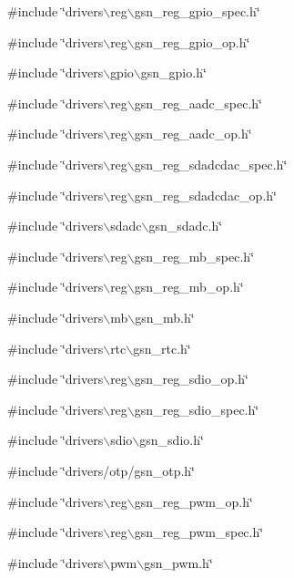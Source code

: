 {\ttfamily \#include \char`\"{}drivers$\backslash$reg$\backslash$gsn\_\-reg\_\-gpio\_\-spec.h\char`\"{}}\par
{\ttfamily \#include \char`\"{}drivers$\backslash$reg$\backslash$gsn\_\-reg\_\-gpio\_\-op.h\char`\"{}}\par
{\ttfamily \#include \char`\"{}drivers$\backslash$gpio$\backslash$gsn\_\-gpio.h\char`\"{}}\par
{\ttfamily \#include \char`\"{}drivers$\backslash$reg$\backslash$gsn\_\-reg\_\-aadc\_\-spec.h\char`\"{}}\par
{\ttfamily \#include \char`\"{}drivers$\backslash$reg$\backslash$gsn\_\-reg\_\-aadc\_\-op.h\char`\"{}}\par
{\ttfamily \#include \char`\"{}drivers$\backslash$reg$\backslash$gsn\_\-reg\_\-sdadcdac\_\-spec.h\char`\"{}}\par
{\ttfamily \#include \char`\"{}drivers$\backslash$reg$\backslash$gsn\_\-reg\_\-sdadcdac\_\-op.h\char`\"{}}\par
{\ttfamily \#include \char`\"{}drivers$\backslash$sdadc$\backslash$gsn\_\-sdadc.h\char`\"{}}\par
{\ttfamily \#include \char`\"{}drivers$\backslash$reg$\backslash$gsn\_\-reg\_\-mb\_\-spec.h\char`\"{}}\par
{\ttfamily \#include \char`\"{}drivers$\backslash$reg$\backslash$gsn\_\-reg\_\-mb\_\-op.h\char`\"{}}\par
{\ttfamily \#include \char`\"{}drivers$\backslash$mb$\backslash$gsn\_\-mb.h\char`\"{}}\par
{\ttfamily \#include \char`\"{}drivers$\backslash$rtc$\backslash$gsn\_\-rtc.h\char`\"{}}\par
{\ttfamily \#include \char`\"{}drivers$\backslash$reg$\backslash$gsn\_\-reg\_\-sdio\_\-op.h\char`\"{}}\par
{\ttfamily \#include \char`\"{}drivers$\backslash$reg$\backslash$gsn\_\-reg\_\-sdio\_\-spec.h\char`\"{}}\par
{\ttfamily \#include \char`\"{}drivers$\backslash$sdio$\backslash$gsn\_\-sdio.h\char`\"{}}\par
{\ttfamily \#include \char`\"{}drivers/otp/gsn\_\-otp.h\char`\"{}}\par
{\ttfamily \#include \char`\"{}drivers$\backslash$reg$\backslash$gsn\_\-reg\_\-pwm\_\-op.h\char`\"{}}\par
{\ttfamily \#include \char`\"{}drivers$\backslash$reg$\backslash$gsn\_\-reg\_\-pwm\_\-spec.h\char`\"{}}\par
{\ttfamily \#include \char`\"{}drivers$\backslash$pwm$\backslash$gsn\_\-pwm.h\char`\"{}}\par
